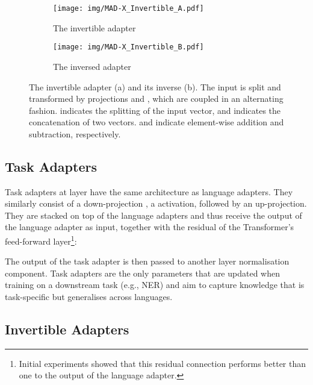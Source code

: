 \documentclass[11pt,a4paper]{article}
\begin{document}
\begin{figure}[!t]
    \centering
    \begin{subfigure}[t]{0.466\linewidth}
        \centering
        \texttt{[image: img/MAD-X\_Invertible\_A.pdf]}
        \caption{The invertible adapter}
        \label{fig:invertible-adapter}
    \end{subfigure}
    \hspace{2mm}
    \begin{subfigure}[t]{0.475\linewidth}
        \centering
        \texttt{[image: img/MAD-X\_Invertible\_B.pdf]}
\caption{The inversed adapter}
        \label{fig:inverse-invertible-adapter}
    \end{subfigure}
    \vspace{-1.5mm}
    \caption{The invertible adapter (a) and its inverse (b). The input is split and transformed by projections  and , which are coupled in an alternating fashion.  indicates the splitting of the input vector, and  indicates the concatenation of two vectors.  and  indicate element-wise addition and subtraction, respectively.  }
    \vspace{-1.5mm}
\label{fig:invertible-adapter-variants}
\end{figure}

\subsection{Task Adapters}

Task adapters  at layer  have the same architecture as language adapters. They similarly consist of a down-projection , a  activation, followed by an up-projection. They are stacked on top of the language adapters and thus receive the output of the language adapter  as input, together with the residual  of the Transformer's feed-forward layer\footnote{Initial experiments showed that this residual connection performs better than one to the output of the language adapter.}:

\noindent The output of the task adapter is then passed to another layer normalisation component. Task adapters are the only parameters that are updated when training on a downstream task (e.g., NER) and aim to capture knowledge that is task-specific but generalises across languages.

 
\subsection{Invertible Adapters}
\label{sec:invertible_adapters}
\end{document}
